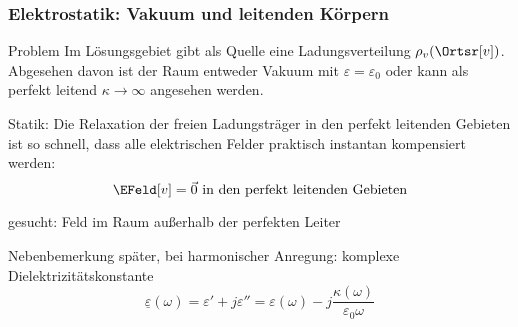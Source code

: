    \begin{frame}
  \frametitle{Elektrostatik: Vakuum und leitenden Körpern}

                \begin{block}{Problem}
    Im Lösungsgebiet gibt als Quelle eine Ladungsverteilung
    $\rho_v(\Ortsr[v])$. Abgesehen davon ist der Raum entweder Vakuum
    mit $\varepsilon=\varepsilon_0$ oder kann als perfekt leitend
    $\kappa \to\infty$ angesehen
    werden.

    \alert{Statik:} Die Relaxation der freien Ladungsträger in den perfekt
    leitenden Gebieten ist so schnell, dass alle elektrischen Felder
    praktisch instantan kompensiert werden:
    $$
    \EFeld[v] = \vec{0} \text{ in den perfekt leitenden Gebieten}
    $$

    \alert{gesucht:} Feld im Raum außerhalb der perfekten Leiter
  \end{block}
  \begin{block}{Nebenbemerkung}
    \alert{später, bei harmonischer Anregung:} komplexe
    Dielektrizitätskonstante
    $$
    \underline{\varepsilon}(\omega) = \varepsilon'+j\varepsilon'' =\varepsilon(\omega) - j \frac{\kappa(\omega)}{\varepsilon_0\omega}
    $$
    \end{block}

  \end{frame}
\begin{frame}

  
\end{frame}

